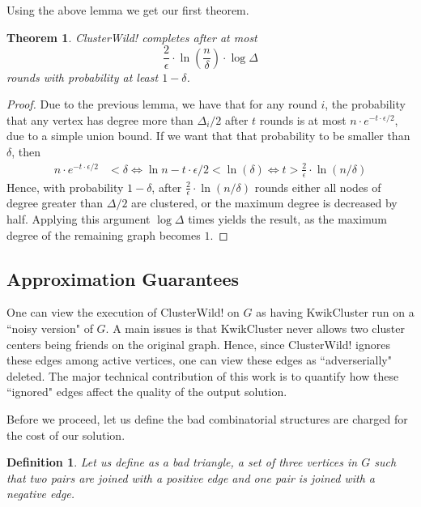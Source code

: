 \documentclass{article} %
\newtheorem{theo}{Theorem}
\newtheorem{defin}{Definition}
\begin{document}
Using the above lemma we get our first theorem.

\begin{theo}
ClusterWild! completes after at most 
$$\frac{2}{\epsilon} \cdot \ln\left(\frac{n}{\delta}\right) \cdot \log \Delta$$ 
rounds with probability at least $1-\delta$.
\end{theo}
\begin{proof}
Due to the previous lemma, we have that for any round $i$, the probability that any vertex has degree more than $\Delta_i/2$ after $t$ rounds is at most $n\cdot e^{-t\cdot \epsilon /2}$, due to a simple union bound.
If we want that that probability to be smaller than $\delta$, then
\begin{align*}
n\cdot e^{-t\cdot \epsilon /2} &< \delta
\Leftrightarrow \ln n-t\cdot \epsilon /2 < \ln(\delta)
\Leftrightarrow t > \frac{2}{\epsilon}\cdot\ln(n/\delta)
\end{align*}
Hence, with probability $1-\delta$, after $\frac{2}{\epsilon}\cdot\ln(n/\delta)$ rounds either all nodes of degree greater than $\Delta/2$ are clustered, or the maximum degree is decreased by half.
Applying this argument $\log\Delta$ times yields the result, as the maximum degree of the remaining graph becomes $1$.
\end{proof}




\subsection{Approximation Guarantees}
One can view the execution of ClusterWild! on $G$ as having KwikCluster run on a ``noisy version" of $G$.
A main issues is that KwikCluster never allows two cluster centers being friends on the original graph.
Hence, since ClusterWild! ignores these edges among active vertices, one can view these edges as ``adverserially" deleted.
The major technical contribution of this work is to quantify how these ``ignored" edges affect the quality of the output solution.

Before we proceed, let us define the bad combinatorial structures are charged for the cost of our solution.


\begin{defin}
Let us define as a {\it bad triangle}, a set of three vertices in $G$ such that two pairs are joined with a positive edge and one pair is joined with a negative edge. 
\end{defin}
\end{document}
